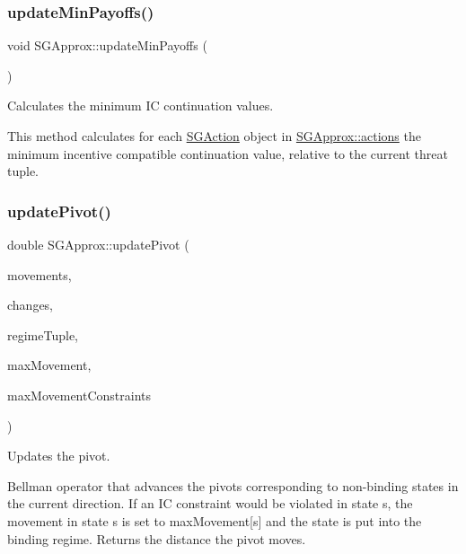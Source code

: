 \subsubsection{\texorpdfstring{update\+Min\+Payoffs()}{updateMinPayoffs()}}
{\footnotesize\ttfamily void S\+G\+Approx\+::update\+Min\+Payoffs (\begin{DoxyParamCaption}{ }\end{DoxyParamCaption})\hspace{0.3cm}{\ttfamily [private]}}



Calculates the minimum IC continuation values. 

This method calculates for each \hyperlink{classSGAction}{S\+G\+Action} object in \hyperlink{classSGApprox_a0fccecf0f5dbe7e9288e47182f180879}{S\+G\+Approx\+::actions} the minimum incentive compatible continuation value, relative to the current threat tuple. \mbox{\label{classSGApprox_afdc9f582e9b83dc68393da177330561e}} 
\subsubsection{\texorpdfstring{update\+Pivot()}{updatePivot()}}
{\footnotesize\ttfamily double S\+G\+Approx\+::update\+Pivot (\begin{DoxyParamCaption}\item[{vector$<$ double $>$ \&}]{movements,  }\item[{vector$<$ double $>$ \&}]{changes,  }\item[{vector$<$ \hyperlink{namespaceSG_a139e4dec41ea0f38aae1f93f60cfff60}{S\+G\+::\+Regime} $>$ \&}]{regime\+Tuple,  }\item[{const vector$<$ double $>$ \&}]{max\+Movement,  }\item[{const vector$<$ \hyperlink{namespaceSG_a139e4dec41ea0f38aae1f93f60cfff60}{S\+G\+::\+Regime} $>$ \&}]{max\+Movement\+Constraints }\end{DoxyParamCaption})\hspace{0.3cm}{\ttfamily [private]}}



Updates the pivot. 

Bellman operator that advances the pivots corresponding to non-\/binding states in the current direction. If an IC constraint would be violated in state s, the movement in state s is set to max\+Movement\mbox{[}s\mbox{]} and the state is put into the binding regime. Returns the distance the pivot moves. 

